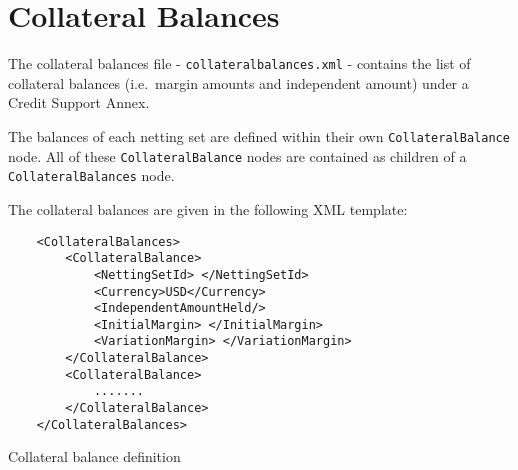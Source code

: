 \section{Collateral Balances}\label{sec:collateralbalances}

The collateral balances file - {\tt collateralbalances.xml} - 
contains the list of collateral balances (i.e.\ margin amounts
and independent amount) under a Credit Support Annex.

\vspace{1em}

The balances of each netting set are defined within their own
\lstinline!CollateralBalance! node. All of these
\lstinline!CollateralBalance! nodes are contained as children
of a \lstinline!CollateralBalances! node.

\vspace{1em}

The collateral balances are given in the following XML template:

\begin{listing}[H]
\begin{verbatim}
    <CollateralBalances>
        <CollateralBalance>
            <NettingSetId> </NettingSetId>
            <Currency>USD</Currency>
            <IndependentAmountHeld/>
            <InitialMargin> </InitialMargin>
            <VariationMargin> </VariationMargin>
        </CollateralBalance>
        <CollateralBalance>
            .......
        </CollateralBalance>
    </CollateralBalances>
\end{verbatim}
\caption{Collateral balance definition}
\label{lst:collateralbalances}
\end{listing}

